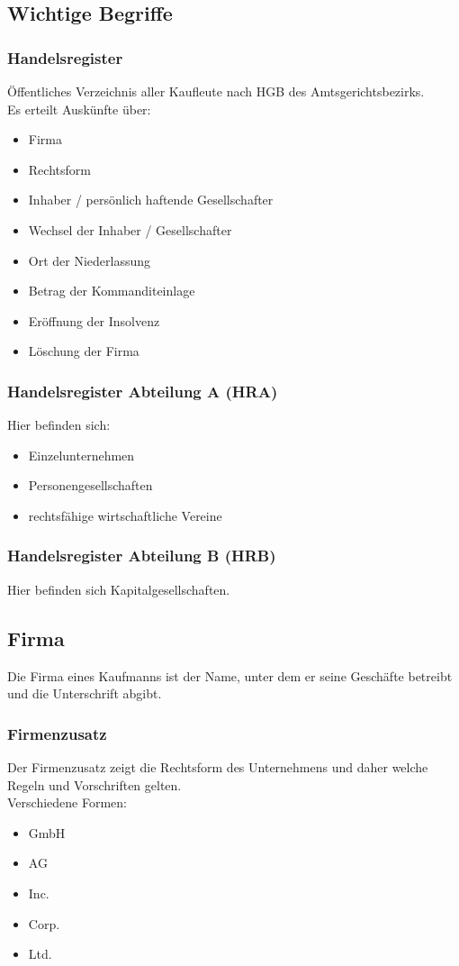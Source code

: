 \documentclass[10pt]{article}
\begin{document}
\subsection{Wichtige Begriffe}
\subsubsection{Handelsregister}
Öffentliches Verzeichnis aller Kaufleute nach HGB des Amtsgerichtsbezirks. \\
Es erteilt Auskünfte über:
\begin{itemize}
\item Firma
\item Rechtsform
\item Inhaber / persönlich haftende Gesellschafter
\item Wechsel der Inhaber / Gesellschafter
\item Ort der Niederlassung
\item Betrag der Kommanditeinlage
\item Eröffnung der Insolvenz
\item Löschung der Firma
\end{itemize}

\subsubsection{Handelsregister Abteilung A (HRA)}
Hier befinden sich:
\begin{itemize}
\item Einzelunternehmen
\item Personengesellschaften
\item  rechtsfähige wirtschaftliche Vereine
\end{itemize}

\subsubsection{Handelsregister Abteilung B (HRB)}
Hier befinden sich  Kapitalgesellschaften.

\subsection{Firma}
Die Firma eines Kaufmanns ist der Name, unter dem er seine Geschäfte betreibt und die Unterschrift abgibt.

\subsubsection{Firmenzusatz}
Der Firmenzusatz zeigt die Rechtsform des Unternehmens und daher welche Regeln und Vorschriften gelten. \\
Verschiedene Formen:
\begin{itemize}
\item GmbH
\item AG
\item Inc.
\item Corp.
\item Ltd.
\end{itemize}
\end{document}
